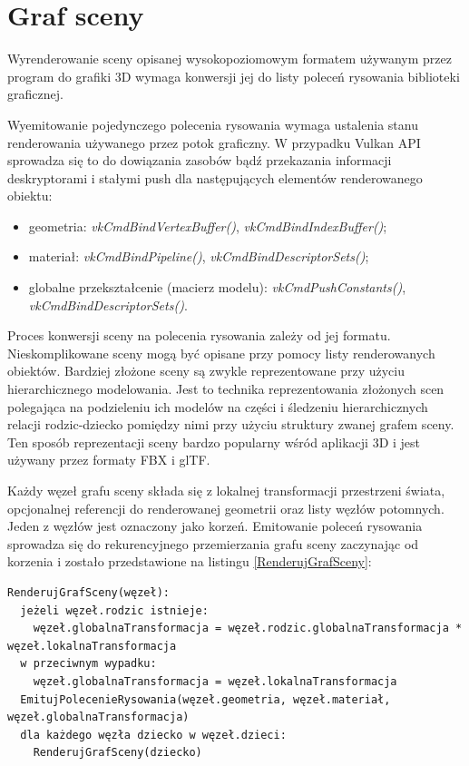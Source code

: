 \section{Graf sceny}

Wyrenderowanie sceny opisanej wysokopoziomowym formatem używanym przez program do grafiki 3D wymaga konwersji jej do listy poleceń rysowania biblioteki graficznej.

Wyemitowanie pojedynczego polecenia rysowania wymaga ustalenia stanu renderowania używanego przez potok graficzny. W przypadku Vulkan API sprowadza się to do dowiązania zasobów bądź przekazania informacji deskryptorami i stałymi push dla następujących elementów renderowanego obiektu:
\begin{itemize}
	\item geometria: \textit{vkCmdBindVertexBuffer()}, \textit{vkCmdBindIndexBuffer()};
	\item materiał: \textit{vkCmdBindPipeline()}, \textit{vkCmdBindDescriptorSets()};
	\item globalne przekształcenie (macierz modelu): \textit{vkCmdPushConstants()}, \textit{vkCmdBindDescriptorSets()}.
\end{itemize}

Proces konwersji sceny na polecenia rysowania zależy od jej formatu.
Nieskomplikowane sceny mogą być opisane przy pomocy listy renderowanych obiektów. Bardziej złożone sceny są zwykle reprezentowane przy użyciu hierarchicznego modelowania.
Jest to technika reprezentowania złożonych scen polegająca na podzieleniu ich modelów na części i śledzeniu hierarchicznych relacji rodzic-dziecko pomiędzy nimi przy użyciu struktury zwanej grafem sceny. Ten sposób reprezentacji sceny bardzo popularny wśród aplikacji 3D i jest używany przez formaty FBX i glTF.

Każdy węzeł grafu sceny składa się z lokalnej transformacji przestrzeni świata, opcjonalnej referencji do renderowanej geometrii oraz listy węzłów potomnych. Jeden z węzłów jest oznaczony jako korzeń.
Emitowanie poleceń rysowania sprowadza się do rekurencyjnego przemierzania grafu sceny zaczynając od korzenia \cite{kosarevsky20213d} i zostało przedstawione na listingu \ref{RenderujGrafSceny}:
\lstset{language=verbatim}
\begin{lstlisting}[caption={Emitowanie poleceń rysowania na podstawie grafu sceny},captionpos=b,label={RenderujGrafSceny}]
RenderujGrafSceny(węzeł):
  jeżeli węzeł.rodzic istnieje:
    węzeł.globalnaTransformacja = węzeł.rodzic.globalnaTransformacja * węzeł.lokalnaTransformacja
  w przeciwnym wypadku:
    węzeł.globalnaTransformacja = węzeł.lokalnaTransformacja
  EmitujPolecenieRysowania(węzeł.geometria, węzeł.materiał, węzeł.globalnaTransformacja)
  dla każdego węzła dziecko w węzeł.dzieci:
    RenderujGrafSceny(dziecko)
\end{lstlisting}


